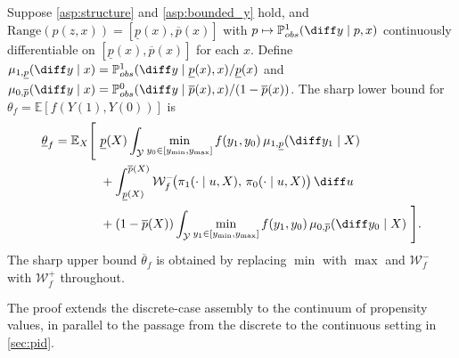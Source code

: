 \begin{theorem}\label{thm:gf_continuous}
    Suppose \cref{asp:structure} and \cref{asp:bounded_y} hold, and $\mathrm{Range}(p(z, x)) = [\underline{p}(x), \overline{p}(x)]$ with $p \mapsto \mathbb{P}_{obs}^1(\diff y \mid p, x)$ continuously differentiable on $[\underline{p}(x), \overline{p}(x)]$ for each $x$. Define $\mu_{1, \underline{p}}(\diff y \mid x) = \mathbb{P}_{obs}^1(\diff y \mid \underline{p}(x), x)/\underline{p}(x)$ and $\mu_{0, \overline{p}}(\diff y \mid x) = \mathbb{P}_{obs}^0(\diff y \mid \overline{p}(x), x)/(1 - \overline{p}(x))$. The sharp lower bound for $\theta_f = \mathbb{E}[f(Y(1), Y(0))]$ is
    \begin{equation}\label{eq:gf_continuous_lower}
        \begin{split}
            \underline{\theta}_f = \mathbb{E}_X\Bigg[\ & \underline{p}(X) \int_{\mathcal{Y}} \min_{y_0 \in [y_{\min}, y_{\max}]} f(y_1, y_0)\, \mu_{1, \underline{p}}(\diff y_1 \mid X)\\
            & + \int_{\underline{p}(X)}^{\overline{p}(X)} \mathcal{W}_f^-\!\bigl(\pi_1(\cdot \mid u, X),\, \pi_0(\cdot \mid u, X)\bigr)\, \diff u\\
            & + (1 - \overline{p}(X)) \int_{\mathcal{Y}} \min_{y_1 \in [y_{\min}, y_{\max}]} f(y_1, y_0)\, \mu_{0, \overline{p}}(\diff y_0 \mid X)\ \Bigg].
        \end{split}
    \end{equation}
    The sharp upper bound $\overline{\theta}_f$ is obtained by replacing $\min$ with $\max$ and $\mathcal{W}_f^-$ with $\mathcal{W}_f^+$ throughout.
\end{theorem}

The proof extends the discrete-case assembly to the continuum of propensity values, in parallel to the passage from the discrete to the continuous setting in \cref{sec:pid}.
